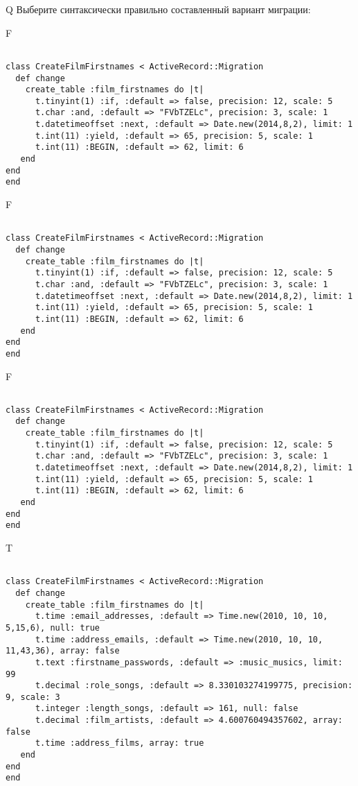 Q
Выберите синтаксически правильно составленный вариант миграции:

F
\begin{verbatim}
		
class CreateFilmFirstnames < ActiveRecord::Migration 
  def change 
    create_table :film_firstnames do |t| 
      t.tinyint(1) :if, :default => false, precision: 12, scale: 5
      t.char :and, :default => "FVbTZELc", precision: 3, scale: 1
      t.datetimeoffset :next, :default => Date.new(2014,8,2), limit: 1
      t.int(11) :yield, :default => 65, precision: 5, scale: 1
      t.int(11) :BEGIN, :default => 62, limit: 6
   end
end
end
\end{verbatim}

F
\begin{verbatim}
		
class CreateFilmFirstnames < ActiveRecord::Migration 
  def change 
    create_table :film_firstnames do |t| 
      t.tinyint(1) :if, :default => false, precision: 12, scale: 5
      t.char :and, :default => "FVbTZELc", precision: 3, scale: 1
      t.datetimeoffset :next, :default => Date.new(2014,8,2), limit: 1
      t.int(11) :yield, :default => 65, precision: 5, scale: 1
      t.int(11) :BEGIN, :default => 62, limit: 6
   end
end
end
\end{verbatim}

F
\begin{verbatim}
		
class CreateFilmFirstnames < ActiveRecord::Migration 
  def change 
    create_table :film_firstnames do |t| 
      t.tinyint(1) :if, :default => false, precision: 12, scale: 5
      t.char :and, :default => "FVbTZELc", precision: 3, scale: 1
      t.datetimeoffset :next, :default => Date.new(2014,8,2), limit: 1
      t.int(11) :yield, :default => 65, precision: 5, scale: 1
      t.int(11) :BEGIN, :default => 62, limit: 6
   end
end
end
\end{verbatim}

T
\begin{verbatim}
		
class CreateFilmFirstnames < ActiveRecord::Migration 
  def change 
    create_table :film_firstnames do |t| 
      t.time :email_addresses, :default => Time.new(2010, 10, 10, 5,15,6), null: true
      t.time :address_emails, :default => Time.new(2010, 10, 10, 11,43,36), array: false
      t.text :firstname_passwords, :default => :music_musics, limit: 99
      t.decimal :role_songs, :default => 8.330103274199775, precision: 9, scale: 3
      t.integer :length_songs, :default => 161, null: false
      t.decimal :film_artists, :default => 4.600760494357602, array: false
      t.time :address_films, array: true
   end
end
end
\end{verbatim}

